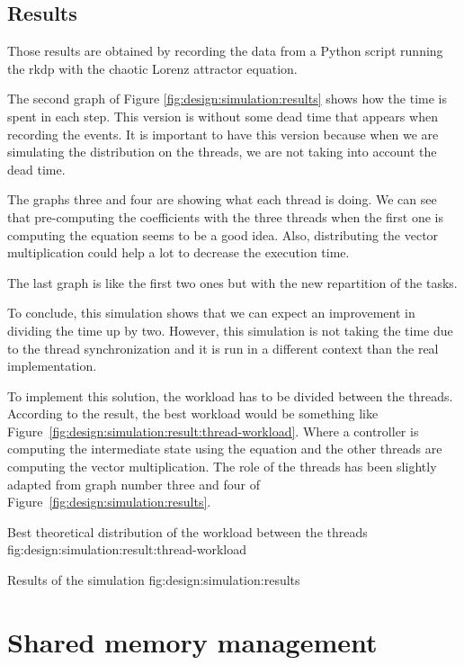 \subsection{Results}
\label{ch:design:simulation:results}

Those results are obtained by recording the data from a Python script running
the \acrshort{rkdp} with the chaotic Lorenz attractor equation.

The second graph of Figure \ref{fig:design:simulation:results} shows
how the time is spent in each step.
This version is without some dead time that appears when recording the events.
It is important to have this version because when we are simulating the
distribution on the threads, we are not taking into account the dead time.

The graphs three and four are showing what each thread is doing.
We can see that pre-computing the coefficients with the three threads when the
first one is computing the equation seems to be a good idea.
Also, distributing the vector multiplication could help a lot to decrease the
execution time.

The last graph is like the first two ones but with the new repartition of the
tasks.

To conclude, this simulation shows that we can expect an improvement in dividing
the time up by two.
However, this simulation is not taking the time due to the thread
synchronization and it is run in a different context than the real implementation.

To implement this solution, the workload has to be divided between the threads.
According to the result, the best workload would be something like Figure~\ref{fig:design:simulation:result:thread-workload}.
Where a controller is computing the intermediate state using the equation and the
other threads are computing the vector multiplication.
The role of the threads has been slightly adapted from graph number three and
four of Figure~\ref{fig:design:simulation:results}.

        {Best theoretical distribution of the workload between the threads}
        {fig:design:simulation:result:thread-workload}

        {Results of the simulation}
        {fig:design:simulation:results}


\section{Shared memory management}
\label{ch:design:shared}

